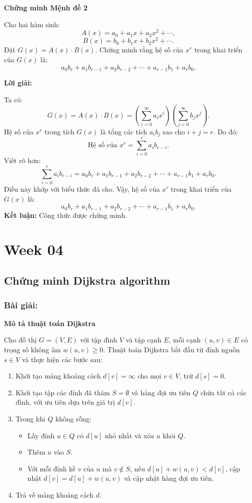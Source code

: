 \documentclass[a4paper,12pt]{article}
\begin{document}
\textbf{Chứng minh Mệnh đề 2}

Cho hai hàm sinh:
\[
A(x) = a_0 + a_1 x + a_2 x^2 + \cdots,
\]
\[
B(x) = b_0 + b_1 x + b_2 x^2 + \cdots.
\]
Đặt \( G(x) = A(x) \cdot B(x) \). Chứng minh rằng hệ số của \( x^r \) trong khai triển của \( G(x) \) là:
\[
a_0 b_r + a_1 b_{r-1} + a_2 b_{r-2} + \cdots + a_{r-1} b_1 + a_r b_0.
\]

\textbf{Lời giải:}

Ta có:
\[
G(x) = A(x) \cdot B(x) = \left( \sum_{i=0}^{\infty} a_i x^i \right) \left( \sum_{j=0}^{\infty} b_j x^j \right).
\]
Hệ số của \( x^r \) trong tích \( G(x) \) là tổng các tích \( a_i b_j \) sao cho \( i + j = r \). Do đó:
\[
\text{Hệ số của } x^r = \sum_{i=0}^{r} a_i b_{r-i}.
\]
Viết rõ hơn:
\[
\sum_{i=0}^{r} a_i b_{r-i} = a_0 b_r + a_1 b_{r-1} + a_2 b_{r-2} + \cdots + a_{r-1} b_1 + a_r b_0.
\]
Điều này khớp với biểu thức đã cho. Vậy, hệ số của \( x^r \) trong khai triển của \( G(x) \) là:
\[
a_0 b_r + a_1 b_{r-1} + a_2 b_{r-2} + \cdots + a_{r-1} b_1 + a_r b_0.
\]
\textbf{Kết luận:} Công thức được chứng minh.

\section*{Week 04}
\subsection*{Chứng minh Dijkstra algorithm}
\subsubsection*{Bài giải:}
\textbf{Mô tả thuật toán Dijkstra}

Cho đồ thị \( G = (V, E) \) với tập đỉnh \( V \) và tập cạnh \( E \), mỗi cạnh \( (u, v) \in E \) có trọng số không âm \( w(u, v) \geq 0 \). Thuật toán Dijkstra bắt đầu từ đỉnh nguồn \( s \in V \) và thực hiện các bước sau:

\begin{enumerate}
    \item Khởi tạo mảng khoảng cách \( d[v] = \infty \) cho mọi \( v \in V \), trừ \( d[s] = 0 \).
    \item Khởi tạo tập các đỉnh đã thăm \( S = \emptyset \) và hàng đợi ưu tiên \( Q \) chứa tất cả các đỉnh, với ưu tiên dựa trên giá trị \( d[v] \).
    \item Trong khi \( Q \) không rỗng:
    \begin{itemize}
        \item Lấy đỉnh \( u \in Q \) có \( d[u] \) nhỏ nhất và xóa \( u \) khỏi \( Q \).
        \item Thêm \( u \) vào \( S \).
        \item Với mỗi đỉnh kề \( v \) của \( u \) mà \( v \notin S \), nếu \( d[u] + w(u, v) < d[v] \), cập nhật \( d[v] = d[u] + w(u, v) \) và cập nhật hàng đợi ưu tiên.
    \end{itemize}
    \item Trả về mảng khoảng cách \( d \).
\end{enumerate}
\end{document}
